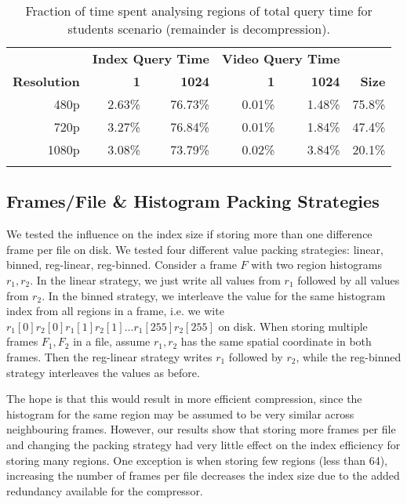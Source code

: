 \begin{table}[t]
    \caption{Fraction of time spent analysing regions of total query time for students scenario (remainder is decompression). }\label{res:time-components}	
	\centering
    \begin{tabular}{r rr rr r}
        ~ & \multicolumn{2}{c|}{\textbf{Index Query Time}} & \multicolumn{2}{c}{\textbf{Video Query Time}} \\
		\cline{2-5}
	    \textbf{Resolution} & \textbf{1} & \textbf{1024} & \textbf{1} & \textbf{1024} & \textbf{Size} \\ \hline\noalign{\smallskip}
	    480p            & 2.63\%  & 76.73\% & 0.01\%  & 1.48\%    & 75.8\%              \\
	    720p            & 3.27\%  & 76.84\% & 0.01\%  & 1.84\%    & 47.4\%              \\
	    1080p           & 3.08\%  & 73.79\% & 0.02\%  & 3.84\%    & 20.1\%              \\\noalign{\smallskip} 
        \hline\noalign{\smallskip}
	   \end{tabular}
\end{table}

\subsection{Frames/File \& Histogram Packing Strategies}
We tested the influence on the index size if storing more than one difference frame per file on disk. We tested four different value packing strategies: linear, binned, reg-linear, reg-binned. Consider a frame $F$ with two region histograms $r_1, r_2$. In the linear strategy, we just write all values from $r_1$ followed by all values from $r_2$. In the binned strategy, we interleave the value for the same histogram index from all regions in a frame, i.e. we wite $r_1[0] r_2[0] r_1[1] r_2[1] \ldots r_1[255] r_2[255]$ on disk. 
When storing multiple frames $F_1, F_2$ in a file, assume $r_1, r_2$ has the same spatial coordinate in both frames. Then the reg-linear strategy writes $r_1$ followed by $r_2$, while the reg-binned strategy interleaves the values as before. 

The hope is that this would result in more efficient compression, since the histogram for the same region may be assumed to be very similar across neighbouring frames. However, our results show that 
storing more frames per file and changing the packing strategy had very little effect on the index efficiency for storing many regions. One exception is when storing few regions (less than 64), increasing the number of frames per file decreases the index size due to the added redundancy available for the compressor.

